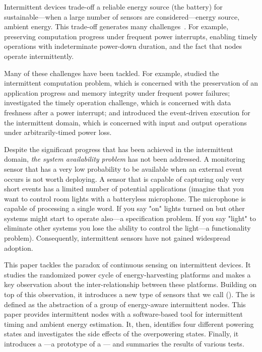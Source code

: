 Intermittent devices trade-off a reliable energy source (the battery) for sustainable---when a large number of sensors are considered---energy source, ambient energy. This trade-off generates many challenges~\cite{lucia2017intermittent}. For example, preserving computation progress under frequent power interrupts, enabling timely operations with indeterminate power-down duration, and the fact that nodes operate intermittently. 

Many of these challenges have been tackled. For example, \cite{lucia2017intermittent,mementos,dino,colin2016chain,balsamo2015hibernus} studied the intermittent computation problem, which is concerned with the preservation of an application progress and memory integrity under frequent power failures; \cite{hester2017timely} investigated the timely operation challenge, which is concerned with data freshness after a power interrupt; and \cite{yildirim2018ink, samoyed_pldi_2019} introduced the event-driven execution for the intermittent domain, which is concerned with input and output operations under arbitrarily-timed power loss.%

Despite the significant progress that has been achieved in the intermittent domain, \textit{the system availability problem} has not been addressed. A monitoring sensor that has a very low probability to be available when an external event occurs is not worth deploying. A sensor that is capable of capturing only very short events has a limited number of potential applications (imagine that you want to control room lights with a batteryless microphone. The microphone is capable of processing a single word. If you say "on" lights turned on but other systems might start to operate also---a specification problem. If you say "light" to eliminate other systems you lose the ability to control the light---a functionality problem). Consequently, intermittent sensors have not gained widespread adoption. 

This paper tackles the paradox of continuous sensing on intermittent devices. It studies the randomized power cycle of energy-harvesting platforms and makes a key observation about the inter-relationship between these platforms. Building on top of this observation, it introduces a new type of sensors that we call \textit{\fullsys} (\sys). The \sys is defined as the abstraction of a group of energy-aware intermittent nodes. This paper provides intermittent nodes with a software-based tool for intermittent timing and ambient energy estimation. It, then, identifies four different \sys powering states and investigates the side effects of the overpowering states. Finally, it introduces a \fullcim---a prototype of a \sys--- and summaries the results of various tests. 

